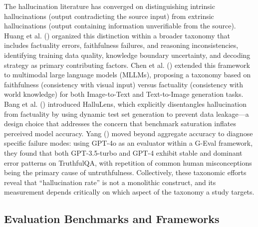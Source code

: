 \documentclass[
  11pt,
  a4paper,
]{article}
\begin{document}
The hallucination literature has converged on distinguishing intrinsic
hallucinations (output contradicting the source input) from extrinsic
hallucinations (output containing information unverifiable from the
source). Huang et al. () organized this
distinction within a broader taxonomy that includes factuality errors,
faithfulness failures, and reasoning inconsistencies, identifying
training data quality, knowledge boundary uncertainty, and decoding
strategy as primary contributing factors. Chen et al.
() extended this framework to multimodal
large language models (MLLMs), proposing a taxonomy based on
faithfulness (consistency with visual input) versus factuality
(consistency with world knowledge) for both Image-to-Text and
Text-to-Image generation tasks. Bang et al.
() introduced HalluLens, which explicitly
disentangles hallucination from factuality by using dynamic test set
generation to prevent data leakage---a design choice that addresses the
concern that benchmark saturation inflates perceived model accuracy.
Yang () moved beyond aggregate accuracy to
diagnose specific failure modes: using GPT-4o as an evaluator within a
G-Eval framework, they found that both GPT-3.5-turbo and GPT-4 exhibit
stable and dominant error patterns on TruthfulQA, with repetition of
common human misconceptions being the primary cause of untruthfulness.
Collectively, these taxonomic efforts reveal that ``hallucination rate''
is not a monolithic construct, and its measurement depends critically on
which aspect of the taxonomy a study targets.

\subsection{Evaluation Benchmarks and
Frameworks}\label{evaluation-benchmarks-and-frameworks}
\end{document}
